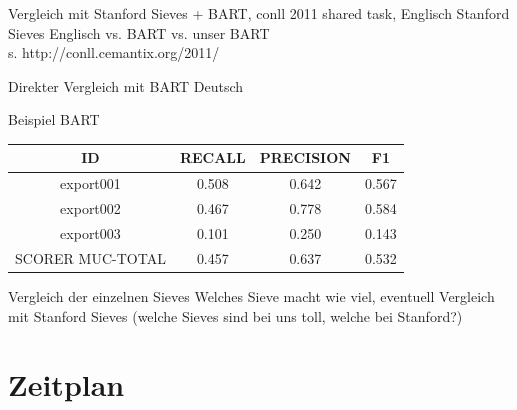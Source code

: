 \documentclass[11pt,a4paper]{beamer}
\begin{document}
\begin{frame}{Vergleich mit Stanford Sieves + BART, conll 2011 shared task, Englisch}
Stanford Sieves Englisch vs. BART vs. unser BART\\

s. http://conll.cemantix.org/2011/
\end{frame}

\begin{frame}{Direkter Vergleich mit BART Deutsch}

Beispiel BART

\begin{tabular}{|c|c|c|c|}
\hline 
ID & RECALL & PRECISION & F1 \\ 
\hline 
export001 & 0.508 & 0.642 & 0.567 \\ 
\hline 
export002 & 0.467 & 0.778   & 0.584 \\ 
\hline 
export003 & 0.101 & 0.250 & 0.143 \\ 
\hline 
SCORER MUC-TOTAL & 0.457 & 0.637   & 0.532 \\
\hline

\end{tabular} 
\end{frame}

\begin{frame}{Vergleich der einzelnen Sieves}
Welches Sieve macht wie viel, eventuell Vergleich mit Stanford Sieves (welche Sieves sind bei uns toll, welche bei Stanford?)

\end{frame}
  

\section{Zeitplan}

\begin{frame}

    \begin{gantt}{10}{9}
    \begin{ganttitle}
    \end{ganttitle}
    \begin{ganttitle}
    \end{ganttitle}
  \end{gantt}
  
\end{frame}
\end{document}
